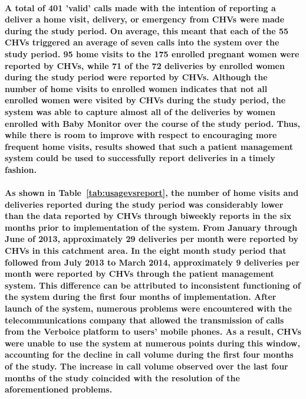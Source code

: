 \paragraph{A total of 401 'valid' calls \textemdash made with the intention of reporting a deliver a home visit, delivery, or emergency \textemdash from CHVs were made during the study period. On average, this meant that each of the 55 CHVs triggered an average of seven calls into the system over the study  period. 95 home visits to the 175 enrolled pregnant women were reported by CHVs, while 71 of the 72 deliveries by enrolled women during the study period were reported by CHVs. Although the number of home visits to enrolled women indicates that not all enrolled women were visited by CHVs during the study period, the system was able to capture almost all of the deliveries by women enrolled with Baby Monitor over the course of the study period. Thus, while there is room to improve with respect to encouraging more frequent home visits, results showed that such a patient management system could be used to successfully report deliveries in a timely fashion.}

\paragraph{As shown in Table~\ref{tab:usagevsreport}, the number of home visits and deliveries reported during the study period was considerably lower than the data reported by CHVs through biweekly reports in the six months prior to implementation of the system. From January through June of 2013,  approximately 29 deliveries per month were reported by CHVs in this catchment area. In the eight month study period that followed from July 2013 to March 2014, approximately 9 deliveries per month were reported by CHVs through the patient management system. This difference can be attributed to inconsistent functioning of the system during the first four months of implementation. After launch of the system, numerous problems were encountered with the telecommunications company that allowed the transmission of calls from the Verboice platform to users' mobile phones. As a result, CHVs were unable to use the system at numerous points during this window, accounting for the decline in call volume during the first four months of the study. The increase in call volume observed over the last four months of the study coincided with the resolution of the aforementioned problems.}

